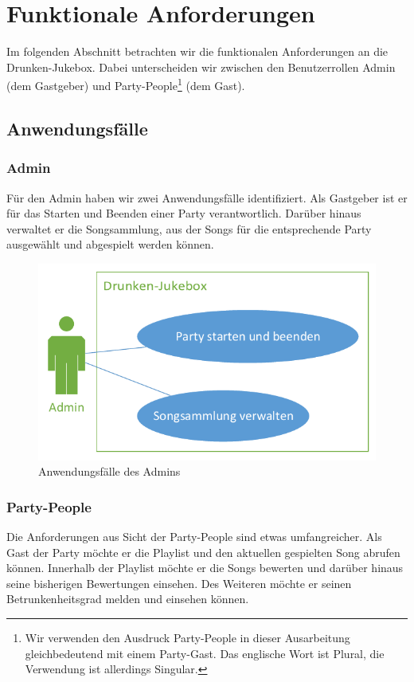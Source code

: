 \newpage
\section{Funktionale Anforderungen}
Im folgenden Abschnitt betrachten wir die funktionalen Anforderungen an die Drunken-Jukebox. Dabei unterscheiden wir zwischen den Benutzerrollen Admin (dem Gastgeber) und Party-People\footnote{Wir verwenden den Ausdruck Party-People in dieser Ausarbeitung gleichbedeutend mit einem Party-Gast. Das englische Wort ist Plural, die Verwendung ist allerdings Singular.} (dem Gast).  

\subsection{Anwendungsfälle}
\subsubsection{Admin}
Für den Admin haben wir zwei Anwendungsfälle identifiziert. Als Gastgeber ist er für das Starten und Beenden einer Party verantwortlich. Darüber hinaus verwaltet er die Songsammlung, aus der Songs für die entsprechende Party ausgewählt und abgespielt werden können.

\begin{figure}[H]
\centering
\includegraphics[width=0.75\linewidth]{Bilder/AdminUseCase}
\caption{Anwendungsfälle des Admins}
\label{fig:AdminUseCase}
\end{figure}

\newpage
\subsubsection{Party-People}
Die Anforderungen aus Sicht der Party-People sind etwas umfangreicher. Als Gast der Party möchte er die Playlist und den aktuellen gespielten Song abrufen können. Innerhalb der Playlist möchte er die Songs bewerten und darüber hinaus seine bisherigen Bewertungen einsehen. Des Weiteren möchte er seinen Betrunkenheitsgrad melden und einsehen können.

